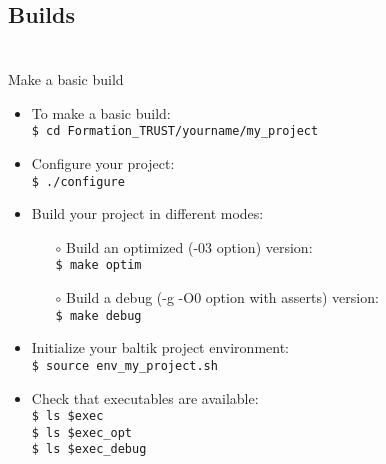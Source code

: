 \documentclass[10pt, hyperref={unicode=true,pdfusetitle, bookmarks=true,bookmarksnumbered=false,bookmarksopen=false, breaklinks=false,pdfborder={0 0 1},backref=true,colorlinks=true,linkcolor=darkblue,pageanchor, urlcolor=darkblue}]{beamer}
\begin{document}
\subsection{{\bf{Builds}}}
\begin{frame}
\begin{columns}[c] 
\tableofcontents[sections={1-4},currentsection, currentsubsection]
\tableofcontents[sections={5-10},currentsection, currentsubsection]
\end{columns}
\end{frame}
\begin{frame}
\frametitle{}
\begin{block}{Make a basic build}

\begin{itemize}
\item To make a basic build:\\
\texttt{\$ cd Formation\_TRUST/yourname/my\_project}

\item Configure your project:\\
\texttt{\$ ./configure}

\item Build your project in different modes:\\
    \begin{itemize}
    \item [$\circ$] Build an optimized (-03 option) version:\\
    \texttt{\$ make optim}
    \item [$\circ$] Build a debug (-g -O0 option with asserts) version:\\
    \texttt{\$ make debug}
    \end{itemize}

\item Initialize your baltik project environment:\\
\texttt{\$ source env\_my\_project.sh}\\

\item Check that executables are available:\\
\texttt{\$ ls \$exec}\\
\texttt{\$ ls \$exec\_opt}\\
\texttt{\$ ls \$exec\_debug}\\

\end{itemize}

\end{block}
\end{frame}
\end{document}

